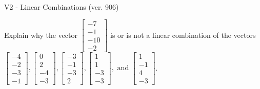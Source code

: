 \begin{exercise}
  \begin{exerciseTitle}V2 - Linear Combinations (ver. 906)\end{exerciseTitle}
  \begin{exerciseStatement}
    Explain why the vector \(\left[\begin{array}{c}
-7 \\
-1 \\
-10 \\
-2
\end{array}\right]\)  is or is not a linear 
	combination of the vectors \(\left[\begin{array}{c}
-4 \\
-2 \\
-3 \\
-1
\end{array}\right] , \left[\begin{array}{c}
0 \\
2 \\
-4 \\
-3
\end{array}\right] , \left[\begin{array}{c}
-3 \\
-1 \\
-3 \\
2
\end{array}\right] , \left[\begin{array}{c}
1 \\
1 \\
-3 \\
-3
\end{array}\right] , \text{ and } \left[\begin{array}{c}
1 \\
-1 \\
4 \\
-3
\end{array}\right]\).
	



\end{exerciseStatement}
\end{exercise}
